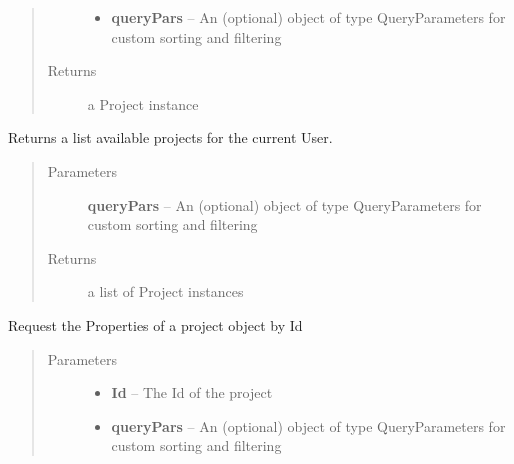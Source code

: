 \documentclass[letterpaper,10pt,english]{sphinxmanual}
\begin{document}
\begin{fulllineitems}
\begin{fulllineitems}
\begin{quote}
\begin{description}
\begin{itemize}
\item {} 
\textbf{queryPars} -- An (optional) object of type QueryParameters for custom sorting and filtering

\end{itemize}

\item[{Returns}] \leavevmode
a Project instance

\end{description}\end{quote}

\end{fulllineitems}


\begin{fulllineitems}
\label{Available modules:BaseSpacePy.api.BaseSpaceAPI.BaseSpaceAPI.getProjectByUser}
Returns a list available projects for the current User.
\begin{quote}\begin{description}
\item[{Parameters}] \leavevmode
\textbf{queryPars} -- An (optional) object of type QueryParameters for custom sorting and filtering

\item[{Returns}] \leavevmode
a list of Project instances

\end{description}\end{quote}

\end{fulllineitems}


\begin{fulllineitems}
\label{Available modules:BaseSpacePy.api.BaseSpaceAPI.BaseSpaceAPI.getProjectPropertiesById}
Request the Properties of a project object by Id
\begin{quote}\begin{description}
\item[{Parameters}] \leavevmode\begin{itemize}
\item {} 
\textbf{Id} -- The Id of the project

\item {} 
\textbf{queryPars} -- An (optional) object of type QueryParameters for custom sorting and filtering


\end{itemize}
\end{description}
\end{quote}
\end{fulllineitems}
\end{fulllineitems}
\end{document}
